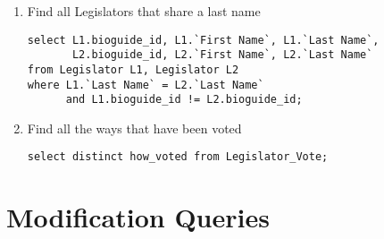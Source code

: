 \documentclass[11pt]{article}
\begin{document}
\begin{enumerate}
\item Find all Legislators that share a last name
\begin{verbatim}
select L1.bioguide_id, L1.`First Name`, L1.`Last Name`,
       L2.bioguide_id, L2.`First Name`, L2.`Last Name` 
from Legislator L1, Legislator L2 
where L1.`Last Name` = L2.`Last Name` 
      and L1.bioguide_id != L2.bioguide_id;
\end{verbatim}

\item Find all the ways that have been voted
\begin{verbatim}
select distinct how_voted from Legislator_Vote;
\end{verbatim}
\end{enumerate}

\section{Modification Queries}
\label{sec-2}
\end{document}
